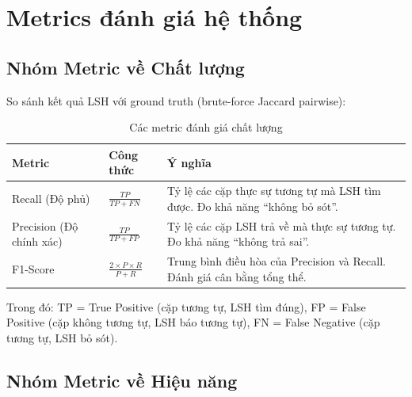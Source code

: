 \newpage
\section{Metrics đánh giá hệ thống}

\subsection{Nhóm Metric về Chất lượng}

So sánh kết quả LSH với ground truth (brute-force Jaccard pairwise):

\begin{table}[h!]
\centering
\caption{Các metric đánh giá chất lượng}
\label{tab:quality-metrics}
\begin{tabularx}{\textwidth}{|l|l|X|}
\hline
\textbf{Metric} & \textbf{Công thức} & \textbf{Ý nghĩa} \\
\hline
Recall (Độ phủ) & $\frac{TP}{TP + FN}$ & Tỷ lệ các cặp thực sự tương tự mà LSH tìm được. Đo khả năng ``không bỏ sót''. \\
\hline
Precision (Độ chính xác) & $\frac{TP}{TP + FP}$ & Tỷ lệ các cặp LSH trả về mà thực sự tương tự. Đo khả năng ``không trả sai''. \\
\hline
F1-Score & $\frac{2 \times P \times R}{P + R}$ & Trung bình điều hòa của Precision và Recall. Đánh giá cân bằng tổng thể. \\
\hline
\end{tabularx}
\end{table}

Trong đó: TP = True Positive (cặp tương tự, LSH tìm đúng), FP = False Positive (cặp không tương tự, LSH báo tương tự), FN = False Negative (cặp tương tự, LSH bỏ sót).

\subsection{Nhóm Metric về Hiệu năng}

